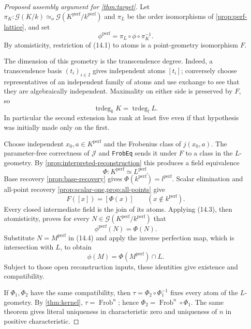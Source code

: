 \documentclass[11pt,oneside]{article}
\theoremstyle{definition}
\theoremstyle{remark}
\newcommand{\trdeg}{\operatorname{trdeg}}
\newcommand{\Frob}{\operatorname{Frob}}
\newcommand{\G}{\mathcal{G}}
\newcommand{\Jrel}{\mathcal{J}}
\newcommand{\lean}[1]{\nolinkurl{#1}}
\begin{document}
\begin{proof}[Proposed assembly argument for \cref{thm:target}]
Let
$\pi_K:\G(K/k)\simeq_o\G(K^{\mathrm{perf}}/k^{\mathrm{perf}})$ and $\pi_L$ be the
order isomorphisms of \cref{prop:perf-lattice}, and set
\[
 \phi^{\mathrm{perf}}=\pi_L\circ\phi\circ\pi_K^{-1}.            \tag{14.1}
\]
By atomisticity, restriction of (14.1) to atoms is a point-geometry isomorphism $F$.

The dimension of this geometry is the transcendence degree.  Indeed, a transcendence
basis $(t_i)_{i\in I}$ gives independent atoms $[t_i]$; conversely choose representatives
of an independent family of atoms and use exchange to see that they are algebraically
independent.  Maximality on either side is preserved by $F$, so
\[
 \trdeg_kK=\trdeg_lL.                                          \tag{14.2}
\]
In particular the second extension has rank at least five even if that hypothesis was
initially made only on the first.

Choose independent $x_0,a\in K^{\mathrm{perf}}$ and the Frobenius class of $j(x_0,a)$.
The parameter-free correctness of $\Jrel$ and \lean{FrobEq} sends it under $F$ to a
class in the $L$-geometry.  By \cref{prop:interpreted-reconstruction} this produces a
field equivalence
\[
 \Phi:K^{\mathrm{perf}}\simeq L^{\mathrm{perf}}.
\]
Base recovery \cref{prop:base-recovery} gives
$\Phi(k^{\mathrm{perf}})=l^{\mathrm{perf}}$.  Scalar elimination and all-point recovery
\cref{prop:scalar-one,prop:all-points} give
\[
 F([x])=[\Phi(x)]\qquad(x\notin k^{\mathrm{perf}}).             \tag{14.3}
\]
Every closed intermediate field is the join of its atoms.  Applying (14.3), then
atomisticity, proves for every $N\in\G(K^{\mathrm{perf}}/k^{\mathrm{perf}})$ that
\[
 \phi^{\mathrm{perf}}(N)=\Phi(N).                              \tag{14.4}
\]
Substitute $N=M^{\mathrm{perf}}$ in (14.4) and apply the inverse perfection map, which is
intersection with $L$, to obtain
\[
 \phi(M)=\Phi(M^{\mathrm{perf}})\cap L.
\]
Subject to those open reconstruction inputs, these identities give existence and compatibility.

If $\Phi_1,\Phi_2$ have the same compatibility, then
$\tau=\Phi_2\circ\Phi_1^{-1}$ fixes every atom of the $L$-geometry.  By
\cref{thm:kernel}, $\tau=\Frob^n$; hence
$\Phi_2=\Frob^n\circ\Phi_1$.  The same theorem gives literal uniqueness in
characteristic zero and uniqueness of $n$ in positive characteristic.


\end{proof}
\end{document}
